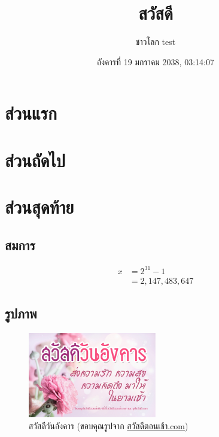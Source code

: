 \documentclass{article}
\title{\textbf{สวัสดี}\vspace{-2ex}}
\author{ชาวโลก test}
\date{อังคารที่ 19 มกราคม 2038, 03:14:07}
\begin{document}
\begin{titlepage}
\maketitle
\thispagestyle{empty}
\tableofcontents
\end{titlepage}

\newpage
{}
\section{ส่วนแรก}
\begin{otherlanguage}{english}
\blindtext[8]
\end{otherlanguage}

\section{ส่วนถัดไป}
\begin{otherlanguage}{english}
\blindtext[10]
\end{otherlanguage}

\newpage
\section{ส่วนสุดท้าย}
\subsection{สมการ}
\begin{align*}
x   &= 2^{31} - 1\\
    &= 2,147,483,647
\end{align*}

\subsection{รูปภาพ}
\begin{figure}[htp]
\centering
\includegraphics[width=0.5\textwidth]{images/happy_tue.jpeg}
\caption[สวัสดีวันอังคาร]{สวัสดีวันอังคาร (ขอบคุณรูปจาก \href{https://xn--b3ctdq1erb0a6aq2a9k0e.com/}{สวัสดีตอนเช้า.com})}
\end{figure}
\end{document}
